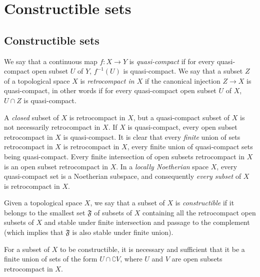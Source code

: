 \section{Constructible sets}
\label{section:0.9}

\subsection{Constructible sets}
\label{subsection:0.9.1}

\begin{definition}[9.1.1]
\label{0.9.1.1}
We say that a continuous map $f:X\to Y$ is \emph{quasi-compact} if
for every quasi-compact open subset $U$ of $Y$, $f^{-1}(U)$ is quasi-compact. We
say that a subset $Z$ of a topological space $X$ is \emph{retrocompact
in $X$} if the canonical injection $Z\to X$ is quasi-compact, in other words
if for every quasi-compact open subset $U$ of $X$, $U\cap Z$ is quasi-compact.
\end{definition}

A \emph{closed} subset of $X$ is retrocompact in $X$, but a
quasi-compact subset of $X$ is not necessarily retrocompact in $X$. If
$X$ is quasi-compact, every open subset retrocompact in $X$ is
quasi-compact. It is clear that every \emph{finite} union of sets
retrocompact in $X$ is retrocompact in $X$, every finite union
of quasi-compact sets being quasi-compact. Every finite intersection
of open subsets retrocompact in $X$ is an open subset retrocompact in $X$. In a
\emph{locally Noetherian} space $X$, every quasi-compact set is a
Noetherian subspace, and consequently \emph{every subset} of $X$ is
retrocompact in $X$.

\begin{definition}[9.1.2]
\label{0.9.1.2}
Given a topological space $X$, we say that a subset of $X$ is
\emph{constructible} if it belongs to the smallest set $\mathfrak{F}$ of
subsets of $X$ containing all the retrocompact open subsets of
$X$ and stable under finite intersection and passage to the complement
(which implies that $\mathfrak{F}$ is also stable under finite union).
\end{definition}

\begin{proposition}[9.1.3]
\label{0.9.1.3}
For a subset of $X$ to be constructible, it is necessary and sufficient
that it be a finite union of sets of the form $U\cap\complement{V}$, where $U$
and $V$ are open subsets retrocompact in $X$.
\end{proposition}

